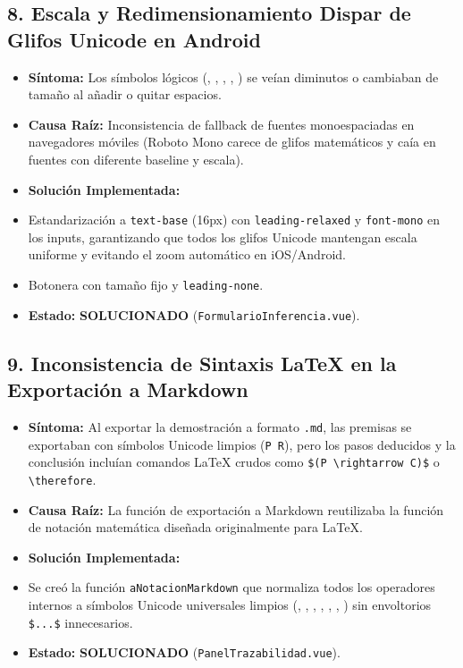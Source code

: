 \documentclass[11pt,a4paper,openany]{book}
\begin{document}
\hrulefill

\subsection{8.  Escala y Redimensionamiento Dispar de Glifos Unicode en Android}

\begin{itemize}[leftmargin=*]
\item \textbf{Síntoma:} Los símbolos lógicos (\texttt{}, \texttt{}, \texttt{}, \texttt{}, \texttt{}) se veían diminutos o cambiaban de tamaño al añadir o quitar espacios.
\item \textbf{Causa Raíz:} Inconsistencia de fallback de fuentes monoespaciadas en navegadores móviles (Roboto Mono carece de glifos matemáticos y caía en fuentes con diferente baseline y escala).
\item \textbf{Solución Implementada:}
\item Estandarización a \texttt{text-base} (16px) con \texttt{leading-relaxed} y \texttt{font-mono} en los inputs, garantizando que todos los glifos Unicode mantengan escala uniforme y evitando el zoom automático en iOS/Android.
\item Botonera con tamaño fijo y \texttt{leading-none}.
\item \textbf{Estado:}  \textbf{SOLUCIONADO} (\texttt{FormularioInferencia.vue}).
\end{itemize}

\hrulefill

\subsection{9.  Inconsistencia de Sintaxis LaTeX en la Exportación a Markdown}

\begin{itemize}[leftmargin=*]
\item \textbf{Síntoma:} Al exportar la demostración a formato \texttt{.md}, las premisas se exportaban con símbolos Unicode limpios (\texttt{P  R}), pero los pasos deducidos y la conclusión incluían comandos LaTeX crudos como \texttt{\$(P \textbackslash{}rightarrow C)\$} o \texttt{\textbackslash{}therefore}.
\item \textbf{Causa Raíz:} La función de exportación a Markdown reutilizaba la función de notación matemática diseñada originalmente para LaTeX.
\item \textbf{Solución Implementada:}
\item Se creó la función \texttt{aNotacionMarkdown} que normaliza todos los operadores internos a símbolos Unicode universales limpios (\texttt{}, \texttt{}, \texttt{}, \texttt{}, \texttt{}, \texttt{}, \texttt{}) sin envoltorios \texttt{\$...\$} innecesarios.
\item \textbf{Estado:}  \textbf{SOLUCIONADO} (\texttt{PanelTrazabilidad.vue}).
\end{itemize}
\end{document}
